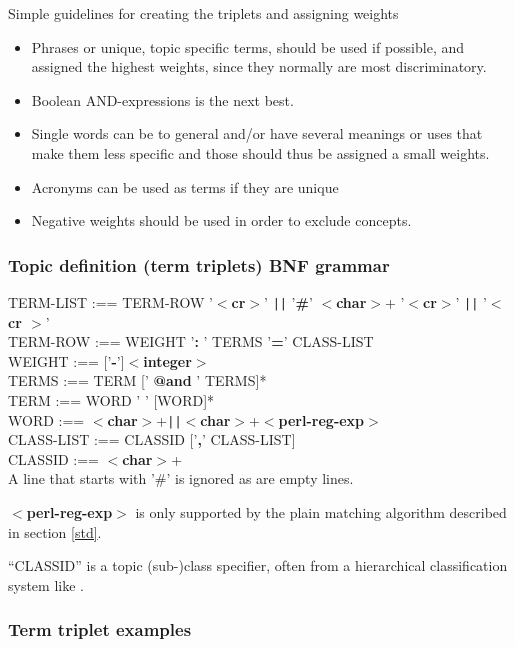 Simple guidelines for creating the triplets and assigning weights
\begin{itemize}
  \item   Phrases or unique, topic specific terms, 
 should be used if possible, and
    assigned the highest weights, since they normally are most discriminatory.
  \item   Boolean AND-expressions is the next best.
  \item   Single words can be to general and/or have several meanings or uses
    that make them less specific and those should thus be assigned
    a small weights.
  \item   Acronyms can be used as terms if they are unique
  \item   Negative weights should be used in order to exclude concepts.
\end{itemize}

\label{termlist}
\subsubsection{Topic definition (term triplets) BNF grammar}
TERM-LIST :== TERM-ROW '{\bf$<$cr$>$}' \verb+||+ '{\bf\#}' {\bf $<$char$>$}+ '{\bf$<$cr$>$}' \verb+||+ '{\bf$<$cr
$>$}' \\
TERM-ROW :== WEIGHT '{\bf: }' TERMS '{\bf=}' CLASS-LIST  \\
WEIGHT :== ['{\bf-}']{\bf$<$integer$>$}  \\
TERMS :== TERM [' {\bf @and} ' TERMS]*  \\
TERM :== WORD ' ' [WORD]*   \\
WORD :== {\bf$<$char$>$}+\verb+||+{\bf$<$char$>$}+{\bf$<$perl-reg-exp$>$}  \\
CLASS-LIST :== CLASSID ['{\bf,}' CLASS-LIST]  \\
CLASSID :== {\bf$<$char$>$}+  \\

A line that starts with '\#' is ignored as are empty lines.

{\bf$<$perl-reg-exp$>$} is only supported by the plain
matching algorithm described in section \ref{std}.

``CLASSID'' is a topic (sub-)class specifier, often from a hierarchical
classification system like .

\subsubsection{Term triplet examples}

